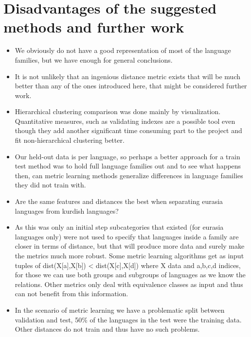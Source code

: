 \documentclass[letterpaper, 11pt]{article}
\begin{document}
\section{Disadvantages of the suggested methods and further work}
\begin{itemize}
	\item We obviously do not have a good representation of most of the language families, but we have enough for general conclusions.
	\item It is not unlikely that an ingenious distance metric exists that will be much better than any of the ones introduced here, that might be considered further work.
	\item Hierarchical clustering comparison was done mainly by visualization. Quantitative measures, such as validating indexes are a possible tool even though they add another significant time consuming part to the project and fit non-hierarchical clustering better.
	\item Our held-out data is per language, so perhaps a better approach for a train test method was to hold full language families out and to see what happens then, can metric learning methods generalize differences in language families they did not train with.
	\item Are the same features and distances the best when separating eurasia languages from kurdish languages?
	\item As this was only an initial step subcategories that existed (for eurasia languages only) were not used to specify that languages inside a family are closer in terms of distance, but that will produce more data and  surely make the metrics much more robust. Some metric learning algorithms get as input tuples of dist(X[a],X[b]) < dist(X[c],X[d]) where X data and a,b,c,d indices, for those we can use both groups and subgroups of languages as we know the relations. Other metrics only deal with equivalence classes as input and thus can not benefit from this information.
	\item In the scenario of metric learning we have a problematic split between validation and test, 50\% of the languages in the test were the training data. Other distances do not train and thus have no such problems.
\end{itemize}
\end{document}
